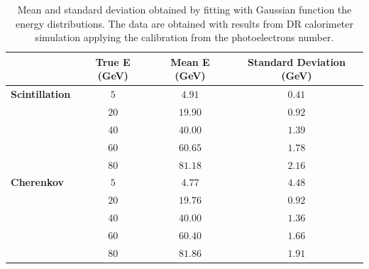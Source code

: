 \begin{table}
	\centering
	\begin{tabular}{lccc}
		\toprule
		& True E (GeV) & Mean E (GeV) & Standard Deviation (GeV) \\
		\midrule
		\textbf{Scintillation} &	$5$ 	& $4.91$ & $0.41$ \\
		& $20$ 	& $19.90$ & $0.92$ \\
		& $40$ 	& $40.00$ & $1.39$ \\
		& $60$ 	& $60.65$ & $1.78$ \\
		& $80$ 	& $81.18$ & $2.16$ \\
		\midrule
		\textbf{Cherenkov} & $5$ 	& $4.77$ & $4.48$ \\
		& $20$ 	& $19.76$ & $0.92$ \\
		& $40$ 	& $40.00$ & $1.36$ \\
		& $60$ 	& $60.40$ & $1.66$ \\
		& $80$ 	& $81.86$ & $1.91$ \\
		\bottomrule
	\end{tabular}
	\caption{Mean and standard deviation obtained by fitting with Gaussian function the energy distributions. The data are obtained with results from DR calorimeter simulation applying the calibration from the photoelectrons number.}
	\label{tab:e_res_pe}
\end{table}

